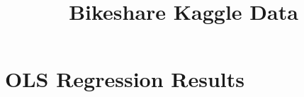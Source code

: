 \documentclass[12pt]{article}
\begin{document}
\title{Bikeshare Kaggle Data}

\maketitle

\section{OLS Regression Results}


\end{document}
